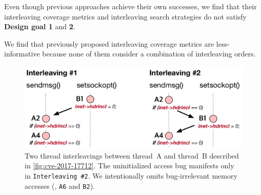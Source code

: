 %
Even though previous approaches achieve their own successes, we find
that their interleaving coverage metrics and interleaving search
strategies do not satisfy \textbf{Design goal 1} and \textbf{2}.


%
We find that previously proposed interleaving coverage metrics are
less-informative because none of them consider a combination of
interleaving orders.

\begin{figure}[t]
  \centering
  \includegraphics[width=0.8\linewidth]{fig/alias-coverage.pdf}
  \caption{Two thread interleavings between thread~A and thread~B
    described in \autoref{fig:cve-2017-17712}.
    The uninitialized access bug manifests only in
    \texttt{Interleaving \#2}.
    We intentionally omits bug-irrelevant memory accesses (\ie,
    \texttt{A6} and \texttt{B2}).}
  \label{fig:alias-coverage}
\end{figure}



